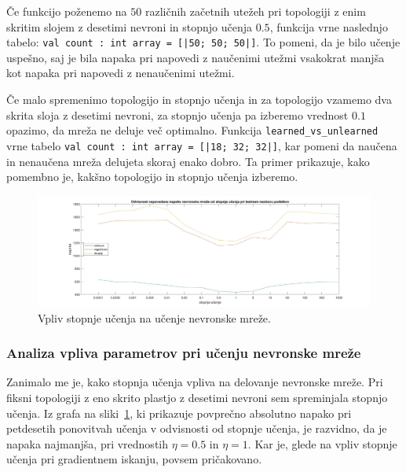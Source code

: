 \documentclass[mat1]{fmfdelo}
\begin{document}
Če funkcijo poženemo na $50$ različnih začetnih utežeh pri topologiji z enim skritim slojem z desetimi nevroni in stopnjo učenja $0.5$, funkcija vrne naslednjo tabelo:
\texttt{val count : int array = [|50; 50; 50|]}. To pomeni, da je bilo učenje uspešno, saj je bila napaka pri napovedi z naučenimi utežmi vsakokrat manjša kot napaka pri napovedi z nenaučenimi utežmi.

Če malo spremenimo topologijo in stopnjo učenja in za topologijo vzamemo dva skrita sloja z desetimi nevroni, za stopnjo učenja pa izberemo vrednost $0.1$ opazimo, da mreža ne deluje več optimalno. Funkcija \-  \texttt{learned\-\_vs\-\_unlearned} vrne tabelo \texttt{val count : int array = [|18; 32; 32|]}, kar pomeni da naučena in nenaučena mreža delujeta skoraj enako dobro. Ta primer prikazuje, kako pomembno je, kakšno topologijo in stopnjo učenja izberemo. 

\begin{figure}[!h]
	\centering
	\includegraphics[width=1\textwidth]{rate.jpg}
	\caption{Vpliv stopnje učenja na učenje nevronske mreže.}
	\label{fig:rate}
\end{figure}

\subsubsection{Analiza vpliva parametrov pri učenju nevronske mreže}
Zanimalo me je, kako stopnja učenja vpliva na delovanje nevronske mreže. Pri fiksni topologiji z eno skrito plastjo z desetimi nevroni sem spreminjala stopnjo učenja. Iz grafa na sliki~\ref{fig:rate}, ki prikazuje povprečno absolutno napako pri petdesetih ponovitvah učenja v odvisnosti od stopnje učenja, je razvidno, da je napaka najmanjša, pri vrednostih $\eta = 0.5$ in $\eta = 1$. Kar je, glede na vpliv stopnje učenja pri gradientnem iskanju, povsem pričakovano.
\end{document}
